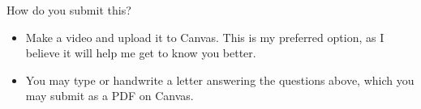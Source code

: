 \documentclass[english]{article}
\begin{document}
\begin{enumerate}
How do you submit this?
\begin{itemize}
\item Make a video and upload it to Canvas.  This is my preferred option, as I believe it will help me get to know you better.
\item You may type or handwrite a letter answering the questions above, which you may submit as a PDF on Canvas.
\end{itemize}






\end{enumerate}
\end{document}

